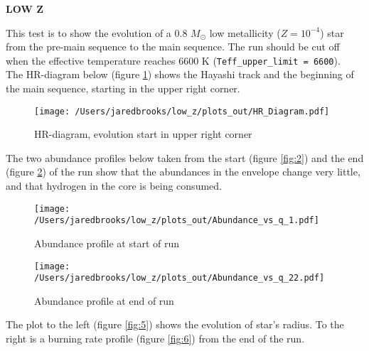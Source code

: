 \documentclass{article}
\begin{document}
	
	\begin{center}
	  \begin{Large}
	    \textbf{LOW Z}\\
	  \end{Large}
	\end{center}

        This test is to show the evolution of a 0.8 $M_\odot$ low metallicity ($Z=10^{-4}$) star from the pre-main sequence to the main sequence.  The run should be cut off when the effective temperature reaches 6600 K (\texttt{Teff\_upper\_limit = 6600}).\\

        The HR-diagram below (figure \ref{fig:1}) shows the Hayashi track and the beginning of the main sequence, starting in the upper right corner.

        \begin{figure}[H]
          \centering
          \texttt{[image: /Users/jaredbrooks/low\_z/plots\_out/HR\_Diagram.pdf]}
          \caption{HR-diagram, evolution start in upper right corner}
          \label{fig:1}
        \end{figure}

        \pagebreak

        The two abundance profiles below taken from the start (figure \ref{fig:2}) and the end (figure \ref{fig:3}) of the run show that the abundances in the envelope change very little, and that hydrogen in the core is being consumed.

        \begin{figure}[H]
          \begin{minipage}[b]{0.5\linewidth}
	    \centering
	    \texttt{[image: /Users/jaredbrooks/low\_z/plots\_out/Abundance\_vs\_q\_1.pdf]}
	    \caption{Abundance profile at start of run}
	    \label{fig:2}
          \end{minipage}
          \hspace{0cm}
          \begin{minipage}[b]{0.5\linewidth}
            \centering
            \texttt{[image: /Users/jaredbrooks/low\_z/plots\_out/Abundance\_vs\_q\_22.pdf]}
            \caption{Abundance profile at end of run}
            \label{fig:3}
          \end{minipage}
	\end{figure}

        \pagebreak

        The plot to the left (figure \ref{fig:5}) shows the evolution of star's radius.  To the right is a burning rate profile (figure \ref{fig:6}) from the end of the run.
\end{document}
